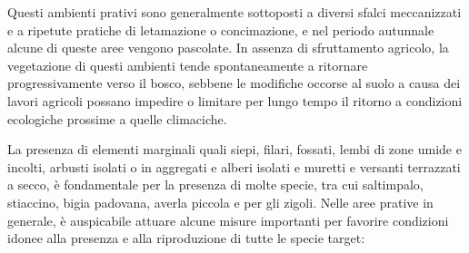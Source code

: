 \documentclass[10pt,twoside,openany,x11names,svgnames,italian,a5paper,dvipsnames,table]{memoir}
\begin{document}
Questi ambienti prativi sono generalmente sottoposti a diversi sfalci meccanizzati e a ripetute pratiche di letamazione o concimazione, e nel periodo autunnale alcune di queste aree vengono pascolate. In assenza di sfruttamento agricolo, la vegetazione di questi ambienti tende spontaneamente a ritornare progressivamente verso il bosco, sebbene le modifiche occorse al suolo a causa dei lavori agricoli possano impedire o limitare per lungo tempo il ritorno a condizioni ecologiche prossime a quelle climaciche. 

La presenza di elementi marginali quali siepi, filari, fossati, lembi di zone umide e incolti, arbusti isolati o in aggregati e alberi isolati e muretti e versanti terrazzati a secco, è fondamentale per la presenza di molte specie, tra cui saltimpalo, stiaccino, bigia padovana, averla piccola e per gli zigoli. 
Nelle aree prative in generale, è auspicabile attuare alcune misure importanti per favorire condizioni idonee alla presenza e alla riproduzione di tutte le specie target:
\end{document}
